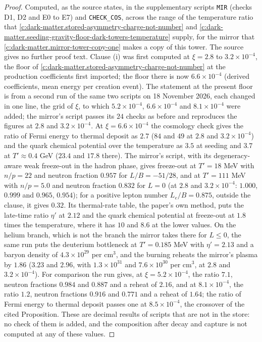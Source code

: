 \documentclass[11pt]{article}
\theoremstyle{definition}
\theoremstyle{plain}
\providecommand{\file}{}\renewcommand{\file}[1]{\texttt{#1}}
\begin{document}
\begin{proof}
Computed, as the source states, in the supplementary scripts \file{MIR} (checks D1, D2 and E0 to E7) and \file{CHECK\_COS}, across the range of the temperature ratio that \ref{c:dark-matter.stored-asymmetry-charge-not-number} and \ref{c:dark-matter.seeding-gravity-floor-dark-towers-temperature} supply, for the mirror that \ref{c:dark-matter.mirror-tower-copy-one} makes a copy of this tower. The source gives no further proof text. Clause (i) was first computed at $\xi = 2.8$ to $3.2 \times 10^{-4}$, the floor of \ref{c:dark-matter.stored-asymmetry-charge-not-number} at the production coefficients first imported; the floor there is now $6.6 \times 10^{-4}$ (derived coefficients, mean energy per creation event). The statement at the present floor is from a second run of the same two scripts on 18 November 2026, each changed in one line, the grid of $\xi$, to which $5.2 \times 10^{-4}$, $6.6 \times 10^{-4}$ and $8.1 \times 10^{-4}$ were added; the mirror's script passes its $24$ checks as before and reproduces the figures at $2.8$ and $3.2 \times 10^{-4}$. At $\xi = 6.6 \times 10^{-4}$ the cosmology check gives the ratio of Fermi energy to thermal deposit as $2.7$ ($84$ and $49$ at $2.8$ and $3.2 \times 10^{-4}$) and the quark chemical potential over the temperature as $3.5$ at seeding and $3.7$ at $T' \approx 0.4$ GeV ($23.4$ and $17.8$ there). The mirror's script, with its degeneracy-aware weak freeze-out in the hadron phase, gives freeze-out at $T' = 18$ MeV with $n/p = 22$ and neutron fraction $0.957$ for $L/B = -51/28$, and at $T' = 111$ MeV with $n/p = 5.0$ and neutron fraction $0.832$ for $L = 0$ (at $2.8$ and $3.2 \times 10^{-4}$: $1.000$, $0.999$ and $0.965$, $0.954$); for a positive lepton number $L_{e}/B = 0.875$, outside the clause, it gives $0.32$. Its thermal-rate table, the paper's own method, puts the late-time ratio $\eta'$ at $2.12$ and the quark chemical potential at freeze-out at $1.8$ times the temperature, where it has $10$ and $8.6$ at the lower values. On the helium branch, which is not the branch the mirror takes there for $L \leq 0$, the same run puts the deuterium bottleneck at $T' = 0.185$ MeV with $\eta' = 2.13$ and a baryon density of $4.3 \times 10^{29}$ per cm$^{3}$, and the burning reheats the mirror's plasma by $1.86$ ($3.23$ and $2.96$, with $1.3 \times 10^{31}$ and $7.6 \times 10^{30}$ per cm$^{3}$, at $2.8$ and $3.2 \times 10^{-4}$). For comparison the run gives, at $\xi = 5.2 \times 10^{-4}$, the ratio $7.1$, neutron fractions $0.984$ and $0.887$ and a reheat of $2.16$, and at $8.1 \times 10^{-4}$, the ratio $1.2$, neutron fractions $0.916$ and $0.771$ and a reheat of $1.64$; the ratio of Fermi energy to thermal deposit passes one at $8.5 \times 10^{-4}$, the crossover of the cited Proposition. These are decimal results of scripts that are not in the store: no check of them is added, and the composition after decay and capture is not computed at any of these values.

\end{proof}
\end{document}
